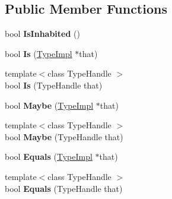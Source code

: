 \subsection*{Public Member Functions}
\begin{DoxyCompactItemize}
\item 
\hypertarget{classv8_1_1internal_1_1_type_impl_a39cdcdf6b3ecb73563a2a65c1cec8f86}{}bool {\bfseries Is\+Inhabited} ()\label{classv8_1_1internal_1_1_type_impl_a39cdcdf6b3ecb73563a2a65c1cec8f86}

\item 
\hypertarget{classv8_1_1internal_1_1_type_impl_a7fb153f8e89adede46ba93ea80680f97}{}bool {\bfseries Is} (\hyperlink{classv8_1_1internal_1_1_type_impl}{Type\+Impl} $\ast$that)\label{classv8_1_1internal_1_1_type_impl_a7fb153f8e89adede46ba93ea80680f97}

\item 
\hypertarget{classv8_1_1internal_1_1_type_impl_a88ea9c0dddc49bce4f61ac85eecac86a}{}{\footnotesize template$<$class Type\+Handle $>$ }\\bool {\bfseries Is} (Type\+Handle that)\label{classv8_1_1internal_1_1_type_impl_a88ea9c0dddc49bce4f61ac85eecac86a}

\item 
\hypertarget{classv8_1_1internal_1_1_type_impl_aee319488c06fa3f20cf52c632f0c092f}{}bool {\bfseries Maybe} (\hyperlink{classv8_1_1internal_1_1_type_impl}{Type\+Impl} $\ast$that)\label{classv8_1_1internal_1_1_type_impl_aee319488c06fa3f20cf52c632f0c092f}

\item 
\hypertarget{classv8_1_1internal_1_1_type_impl_a0cbc221b6f0903e1544605bbe91a5a68}{}{\footnotesize template$<$class Type\+Handle $>$ }\\bool {\bfseries Maybe} (Type\+Handle that)\label{classv8_1_1internal_1_1_type_impl_a0cbc221b6f0903e1544605bbe91a5a68}

\item 
\hypertarget{classv8_1_1internal_1_1_type_impl_a9e5df48e98034b278ef05bc04ba69161}{}bool {\bfseries Equals} (\hyperlink{classv8_1_1internal_1_1_type_impl}{Type\+Impl} $\ast$that)\label{classv8_1_1internal_1_1_type_impl_a9e5df48e98034b278ef05bc04ba69161}

\item 
\hypertarget{classv8_1_1internal_1_1_type_impl_a7b1d5836ac66ff859b90d107e55d7ee3}{}{\footnotesize template$<$class Type\+Handle $>$ }\\bool {\bfseries Equals} (Type\+Handle that)\label{classv8_1_1internal_1_1_type_impl_a7b1d5836ac66ff859b90d107e55d7ee3}


\end{DoxyCompactItemize}
